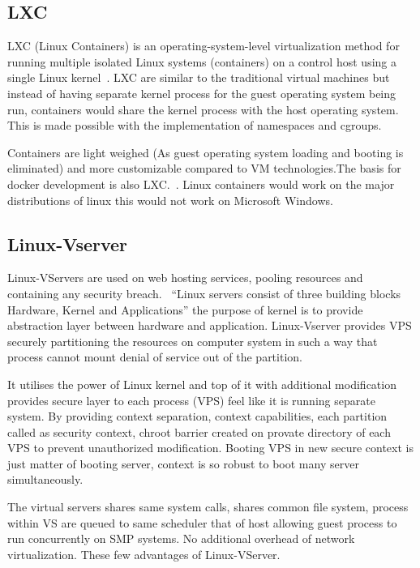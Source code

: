 \subsection{LXC \cv}
     
LXC (Linux Containers) is an operating-system-level virtualization
method for running multiple isolated Linux systems (containers) on a
control host using a single Linux kernel~\cite{www-wiki-lxc}. LXC are
similar to the traditional virtual machines but instead of having
separate kernel process for the guest operating system being run,
containers would share the kernel process with the host operating
system. This is made possible with the implementation of namespaces
and cgroups.~\cite{www-jpablo}

Containers are light weighed (As guest operating system loading and
booting is eliminated) and more customizable compared to VM
technologies.The basis for docker development is also
LXC.~\cite{www-infoworld}. Linux containers would work on the major
distributions of linux this would not work on Microsoft Windows.
	
\subsection{Linux-Vserver \cv}

Linux-VServers are used on web hosting services, pooling resources and
containing any security breach.~\cite{www-linux-vserver-org} ``Linux
servers consist of three building blocks Hardware, Kernel and
Applications'' the purpose of kernel is to provide abstraction layer
between hardware and application. Linux-Vserver provides VPS securely
partitioning the resources on computer system in such a way that
process cannot mount denial of service out of the partition.
     
     It utilises the power of Linux kernel and top of it with
     additional modification provides secure layer to each process
     (VPS) feel like it is running separate system.  By providing
     context separation, context capabilities, each partition called
     as security context, chroot barrier created on provate directory
     of each VPS to prevent unauthorized modification. Booting VPS in
     new secure context is just matter of booting server, context is
     so robust to boot many server simultaneously.
     
     The virtual servers shares same system calls, shares common file
     system, process within VS are queued to same scheduler that of
     host allowing guest process to run concurrently on SMP
     systems. No additional overhead of network virtualization.  These
     few advantages of Linux-VServer.

